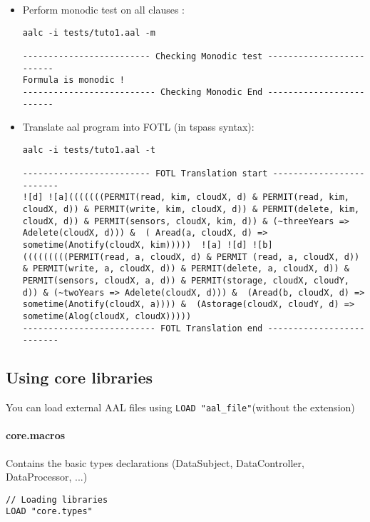{\begin{itemize}
	\item Perform monodic test on all clauses :
\begin{lstlisting}
aalc -i tests/tuto1.aal -m

------------------------- Checking Monodic test -------------------------
Formula is monodic !
-------------------------- Checking Monodic End -------------------------
\end{lstlisting}


	\item Translate aal program into FOTL (in tspass syntax):
\begin{lstlisting}
aalc -i tests/tuto1.aal -t

------------------------- FOTL Translation start -------------------------
![d] ![a](((((((PERMIT(read, kim, cloudX, d) & PERMIT(read, kim, cloudX, d)) & PERMIT(write, kim, cloudX, d)) & PERMIT(delete, kim, cloudX, d)) & PERMIT(sensors, cloudX, kim, d)) & (~threeYears => Adelete(cloudX, d))) &  ( Aread(a, cloudX, d) => sometime(Anotify(cloudX, kim)))))  ![a] ![d] ![b](((((((((PERMIT(read, a, cloudX, d) & PERMIT (read, a, cloudX, d)) & PERMIT(write, a, cloudX, d)) & PERMIT(delete, a, cloudX, d)) & PERMIT(sensors, cloudX, a, d)) & PERMIT(storage, cloudX, cloudY, d)) & (~twoYears => Adelete(cloudX, d))) &  (Aread(b, cloudX, d) => sometime(Anotify(cloudX, a)))) &  (Astorage(cloudX, cloudY, d) => sometime(Alog(cloudX, cloudX))))) 
-------------------------- FOTL Translation end --------------------------
\end{lstlisting}

\end{itemize}
}


\subsection{Using core libraries}
You can load external AAL files using \texttt{LOAD "aal\_file"}(without the extension) 

\paragraph{core.macros} Contains the basic types declarations (DataSubject, DataController, DataProcessor, ...)
\begin{lstlisting}
// Loading libraries
LOAD "core.types"
\end{lstlisting}


